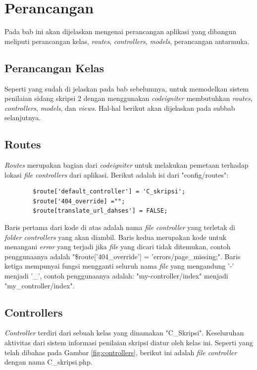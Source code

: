 \chapter{Perancangan}
\label{chap: perancangan}
	
	Pada bab ini akan dijelaskan mengenai perancangan aplikasi yang dibangun meliputi perancangan kelas, \textit{routes}, \textit{controllers}, \textit{models}, perancangan antarmuka.
	
	\section{Perancangan Kelas}
	\label{sec: rancangKelas}
	
	Seperti yang sudah di jelaskan pada bab sebelumnya, untuk memodelkan sistem penilaian sidang skripsi 2 dengan menggunakan \textit{codeigniter} membutuhkan \textit{routes}, \textit{controllers}, \textit{models}, dan \textit{views}. Hal-hal berikut akan dijelaskan pada subbab selanjutnya.
	
	\section{Routes}
	\label{sec: routes}
	
	\textit{Routes} merupakan bagian dari \textit{codeigniter} untuk melakukan pemetaan terhadap lokasi \textit{file controllers} dari aplikasi. Berikut adalah isi dari "config/routes":
	\begin{lstlisting}
		$route['default_controller'] = 'C_skripsi';
		$route['404_override] ="";
		$route[translate_url_dahses'] =	FALSE;
	\end{lstlisting}
	Baris pertama dari kode di atas adalah nama \textit{file controller} yang terletak di \textit{folder controllers} yang akan diambil. Baris kedua merupakan kode untuk menangani \textit{error} yang terjadi jika \textit{file} yang dicari tidak ditemukan, contoh penggunaanya adalah "\$route['404\_override'] = 'errors/page\_missing;". Baris ketiga mempunyai fungsi mengganti seluruh nama \textit{file} yang mengandung '-' menjadi '\_', contoh penggunaanya adalah: "my-controller/index"	menjadi "my\_controller/index".

	\section{Controllers}
	\label{sec: controllers}
	
	\textit{Controller} terdiri dari sebuah kelas yang dinamakan "C\_Skripsi". Keseluruhan aktivitas dari sistem informasi penilaian skripsi diatur oleh kelas ini. Seperti yang telah dibahas pada Gambar \ref{fig:controllers}, berikut ini adalah \textit{file controller} dengan nama C\_skripsi.php.
	
